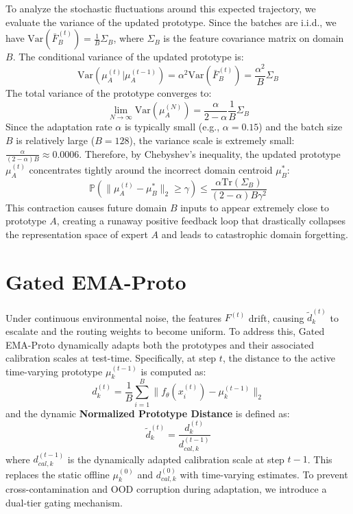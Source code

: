 \documentclass{article}
\theoremstyle{plain}
\theoremstyle{definition}
\theoremstyle{remark}
\begin{document}
To analyze the stochastic fluctuations around this expected trajectory, we evaluate the variance of the updated prototype. Since the batches are i.i.d., we have $\text{Var}(\bar{F}_B^{(t)}) = \frac{1}{B} \Sigma_B$, where $\Sigma_B$ is the feature covariance matrix on domain $B$. The conditional variance of the updated prototype is:
\begin{equation}
    \text{Var}(\mu_A^{(t)} | \mu_A^{(t-1)}) = \alpha^2 \text{Var}(\bar{F}_B^{(t)}) = \frac{\alpha^2}{B} \Sigma_B
\end{equation}
The total variance of the prototype converges to:
\begin{equation}
    \lim_{N \to \infty} \text{Var}(\mu_A^{(N)}) = \frac{\alpha}{2-\alpha} \frac{1}{B} \Sigma_B
\end{equation}
Since the adaptation rate $\alpha$ is typically small (e.g., $\alpha = 0.15$) and the batch size $B$ is relatively large ($B = 128$), the variance scale is extremely small: $\frac{\alpha}{(2-\alpha)B} \approx 0.0006$. Therefore, by Chebyshev's inequality, the updated prototype $\mu_A^{(t)}$ concentrates tightly around the incorrect domain centroid $\mu_B^*$:
\begin{equation}
    \mathbb{P}\left(\|\mu_A^{(t)} - \mu_B^*\|_2 \ge \gamma\right) \le \frac{\alpha \text{Tr}(\Sigma_B)}{(2-\alpha) B \gamma^2}
\end{equation}
This contraction causes future domain $B$ inputs to appear extremely close to prototype $A$, creating a runaway positive feedback loop that drastically collapses the representation space of expert $A$ and leads to catastrophic domain forgetting.

\section{Gated EMA-Proto}
\label{sec:method}
Under continuous environmental noise, the features $F^{(t)}$ drift, causing $\tilde{d}_k^{(t)}$ to escalate and the routing weights to become uniform. To address this, Gated EMA-Proto dynamically adapts both the prototypes and their associated calibration scales at test-time. Specifically, at step $t$, the distance to the active time-varying prototype $\mu_k^{(t-1)}$ is computed as:
\begin{equation}
    d_k^{(t)} = \frac{1}{B} \sum_{i=1}^B \| f_\theta(x_i^{(t)}) - \mu_k^{(t-1)} \|_2
\end{equation}
and the dynamic \textbf{Normalized Prototype Distance} is defined as:
\begin{equation}
    \tilde{d}_k^{(t)} = \frac{d_k^{(t)}}{d_{cal, k}^{(t-1)}}
\end{equation}
where $d_{cal, k}^{(t-1)}$ is the dynamically adapted calibration scale at step $t-1$. This replaces the static offline $\mu_k^{(0)}$ and $d_{cal, k}^{(0)}$ with time-varying estimates. To prevent cross-contamination and OOD corruption during adaptation, we introduce a dual-tier gating mechanism.
\end{document}

